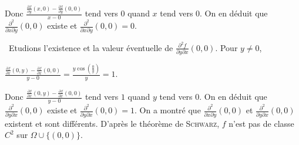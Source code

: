 {{Donc $ \frac{ \frac{\partial f}{\partial y}(x,0)- \frac{\partial f}{\partial y}(0,0)}{x-0}$ tend vers $0$ quand $x$ tend vers $0$. On en déduit que $ \frac{\partial^2}{\partial x\partial y}(0,0)$ existe et $ \frac{\partial^2}{\partial x\partial y}(0,0)=0$. 

\textbullet~Etudions l'existence et la valeur éventuelle de $ \frac{\partial^2f}{\partial y\partial x}(0,0)$. Pour $y\neq0$,

\begin{center} 
$ \frac{ \frac{\partial f}{\partial x}(0,y)- \frac{\partial f}{\partial x}(0,0)}{y-0}= \frac{y\cos\left( \frac{0}{y}\right)}{y}=1$.
\end{center}

Donc $ \frac{ \frac{\partial f}{\partial x}(0,y)- \frac{\partial f}{\partial x}(0,0)}{y-0}$ tend vers $1$ quand $y$ tend vers $0$. On en déduit que $ \frac{\partial^2}{\partial y\partial x}(0,0)$ existe et $ \frac{\partial^2}{\partial y\partial x}(0,0)=1$. On a montré que $ \frac{\partial^2}{\partial x\partial y}(0,0)$ et $ \frac{\partial^2}{\partial y\partial x}(0,0)$ existent et sont différents. D'après le théorème de \textsc{Schwarz}, $f$ n'est pas de classe $C^2$ sur $\Omega\cup\{(0,0)\}$.
}
}
